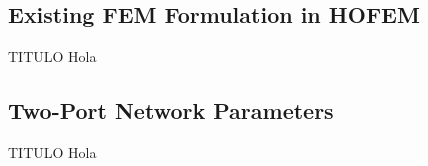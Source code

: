 %
%

\subsection{Existing FEM Formulation in HOFEM}

\begin{frame}{TITULO}
  Hola
\end{frame}


\subsection{Two-Port Network Parameters}

\begin{frame}{TITULO}
  Hola
\end{frame}


